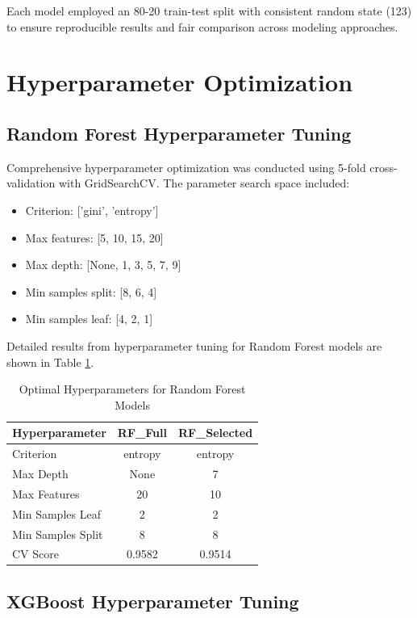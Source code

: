 Each model employed an 80-20 train-test split with consistent random state (123) to ensure reproducible results and fair comparison across modeling approaches.

\section*{Hyperparameter Optimization}

\subsection*{Random Forest Hyperparameter Tuning}

Comprehensive hyperparameter optimization was conducted using 5-fold cross-validation with GridSearchCV. The parameter search space included:

\begin{itemize}
    \item Criterion: ['gini', 'entropy']
    \item Max features: [5, 10, 15, 20]
    \item Max depth: [None, 1, 3, 5, 7, 9]
    \item Min samples split: [8, 6, 4]
    \item Min samples leaf: [4, 2, 1]
\end{itemize}

Detailed results from hyperparameter tuning for Random Forest models are shown in Table \ref{tab:rf_hyperparams}.

\begin{table}[H]
    \centering
    \caption{Optimal Hyperparameters for Random Forest Models}
    \label{tab:rf_hyperparams}
    \begin{tabular}{lcc}
    \toprule
    \textbf{Hyperparameter} & \textbf{RF\_Full} & \textbf{RF\_Selected} \\
    \midrule
    Criterion & entropy & entropy \\
    Max Depth & None & 7 \\
    Max Features & 20 & 10 \\
    Min Samples Leaf & 2 & 2 \\
    Min Samples Split & 8 & 8 \\
    CV Score & 0.9582 & 0.9514 \\
    \bottomrule
    \end{tabular}
\end{table}

\subsection*{XGBoost Hyperparameter Tuning}


